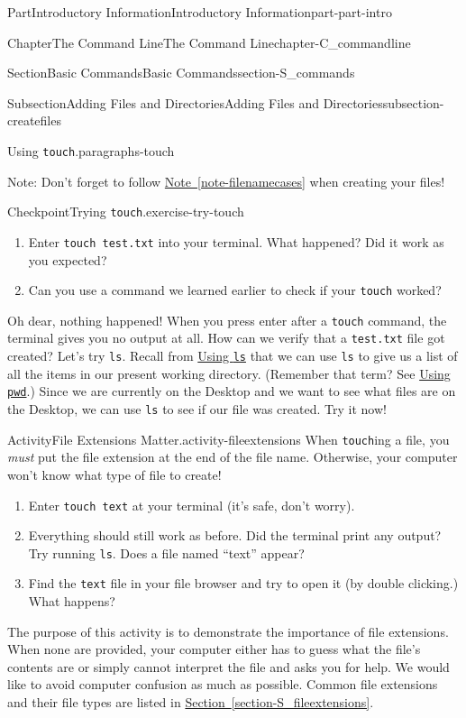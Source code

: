 \documentclass[oneside,10pt,]{book}
\newcommand{\xreffont}{\relax}
\newcommand{\mono}[1]{\texttt{#1}}
\begin{document}
\begin{partptx}{Part}{Introductory Information}{}{Introductory Information}{}{}{part-part-intro}
\begin{chapterptx}{Chapter}{The Command Line}{}{The Command Line}{}{}{chapter-C_commandline}
\begin{sectionptx}{Section}{Basic Commands}{}{Basic Commands}{}{}{section-S_commands}
\begin{subsectionptx}{Subsection}{Adding Files and Directories}{}{Adding Files and Directories}{}{}{subsection-createfiles}
\begin{paragraphs}{Using \mono{touch}.}{paragraphs-touch}
\par
Note: Don't forget to follow \hyperref[note-filenamecases]{Note~{\xreffont\ref{note-filenamecases}}} when creating your files!%
\begin{inlineexercise}{Checkpoint}{Trying \mono{touch}.}{exercise-try-touch}%
\begin{enumerate}[font=\bfseries,label=(\alph*),ref=\alph*]%
\item{}Enter \mono{touch test.txt} into your terminal. What happened? Did it work as you expected?%
\item{}Can you use a command we learned earlier to check if your \mono{touch} worked?%
\end{enumerate}%
\end{inlineexercise}%
Oh dear, nothing happened! When you press enter after a \mono{touch} command, the terminal gives you no output at all. How can we verify that a \mono{test.txt} file got created? Let's try \mono{ls}. Recall from \hyperlink{paragraphs-ls}{Using \mono{ls}} that we can use \mono{ls} to give us a list of all the items in our present working directory. (Remember that term? See \hyperlink{paragraphs-pwd}{Using \mono{pwd}}.) Since we are currently on the Desktop and we want to see what files are on the Desktop, we can use \mono{ls} to see if our file was created. Try it now!%
\begin{activity}{Activity}{File Extensions Matter.}{activity-fileextensions}%
%
%
When \mono{touch}ing a file, you \emph{must} put the file extension at the end of the file name. Otherwise, your computer won't know what type of file to create!%
\begin{enumerate}[font=\bfseries,label=(\alph*),ref=\alph*]%
\item{}Enter \mono{touch text} at your terminal (it's safe, don't worry).%
\item{}Everything should still work as before. Did the terminal print any output? Try running \mono{ls}. Does a file named ``text'' appear?%
\item{}Find the \mono{text} file in your file browser and try to open it (by double clicking.) What happens?%
\end{enumerate}%
The purpose of this activity is to demonstrate the importance of file extensions. When none are provided, your computer either has to guess what the file's contents are or simply cannot interpret the file and asks you for help. We would like to avoid computer confusion as much as possible. Common file extensions and their file types are listed in \hyperref[section-S_fileextensions]{Section~{\xreffont\ref{section-S_fileextensions}}}.%

\end{activity}
\end{paragraphs}
\end{subsectionptx}
\end{sectionptx}
\end{chapterptx}
\end{partptx}
\end{document}
